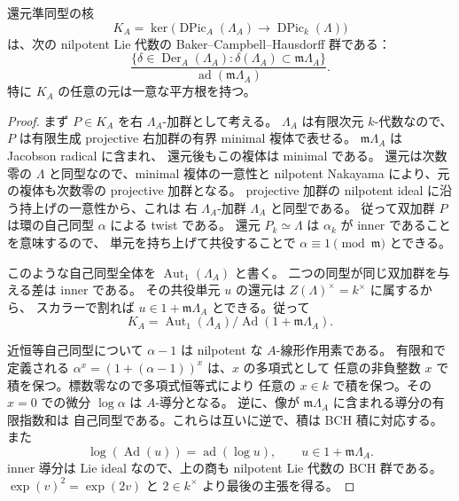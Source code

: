 \begin{lemma}
\label{lem:artin-infinitesimal-dpic}
還元準同型の核
\[
 K_A=\ker\bigl(\operatorname{DPic}_A(\Lambda_A)
           \longrightarrow\operatorname{DPic}_k(\Lambda)\bigr)
\]
は、次の nilpotent Lie 代数の Baker--Campbell--Hausdorff 群である：
\[
 \frac{\{\delta\in\operatorname{Der}_A(\Lambda_A):
                    \delta(\Lambda_A)\subset\mathfrak m\Lambda_A\}}
      {\operatorname{ad}(\mathfrak m\Lambda_A)}.
\]
特に $K_A$ の任意の元は一意な平方根を持つ。
\end{lemma}
\begin{proof}
まず $P\in K_A$ を右 $\Lambda_A$-加群として考える。
$\Lambda_A$ は有限次元 $k$-代数なので、$P$ は有限生成 projective
右加群の有界 minimal 複体で表せる。
$\mathfrak m\Lambda_A$ は Jacobson radical に含まれ、
還元後もこの複体は minimal である。
還元は次数零の $\Lambda$ と同型なので、minimal 複体の一意性と
nilpotent Nakayama により、元の複体も次数零の projective 加群となる。
projective 加群の nilpotent ideal に沿う持上げの一意性から、これは
右 $\Lambda_A$-加群 $\Lambda_A$ と同型である。
従って双加群 $P$ は環の自己同型 $\alpha$ による twist である。
還元 $P_k\simeq\Lambda$ は $\alpha_k$ が inner であることを意味するので、
単元を持ち上げて共役することで $\alpha\equiv1\pmod{\mathfrak m}$ とできる。

このような自己同型全体を $\operatorname{Aut}_1(\Lambda_A)$ と書く。
二つの同型が同じ双加群を与える差は inner である。
その共役単元 $u$ の還元は $Z(\Lambda)^\times=k^\times$ に属するから、
スカラーで割れば $u\in1+\mathfrak m\Lambda_A$ とできる。従って
\[
 K_A=\operatorname{Aut}_1(\Lambda_A)
           /\operatorname{Ad}(1+\mathfrak m\Lambda_A).
\]

近恒等自己同型について $\alpha-1$ は nilpotent な $A$-線形作用素である。
有限和で定義される $\alpha^x=(1+(\alpha-1))^x$ は、$x$ の多項式として
任意の非負整数 $x$ で積を保つ。標数零なので多項式恒等式により
任意の $x\in k$ で積を保つ。その $x=0$ での微分
$\log\alpha$ は $A$-導分となる。
逆に、像が $\mathfrak m\Lambda_A$ に含まれる導分の有限指数和は
自己同型である。これらは互いに逆で、積は BCH 積に対応する。
また
\[
 \log(\operatorname{Ad}(u))=\operatorname{ad}(\log u),
 \qquad u\in1+\mathfrak m\Lambda_A.
\]
inner 導分は Lie ideal なので、上の商も nilpotent Lie 代数の
BCH 群である。$\exp(v)^2=\exp(2v)$ と $2\in k^\times$ より最後の主張を得る。
\end{proof}

